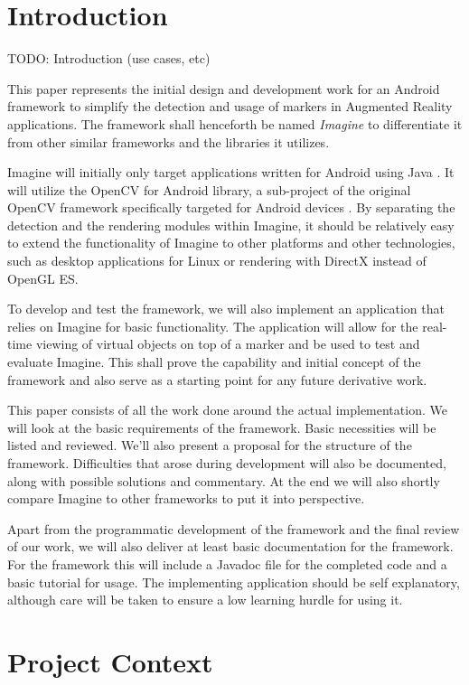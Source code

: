 \section{Introduction}

TODO: Introduction (use cases, etc)

This paper represents the initial design and development work for an Android framework to simplify the detection and usage of markers in Augmented Reality applications.
The framework shall henceforth be named \textit{Imagine} to differentiate it from other similar frameworks and the libraries it utilizes.

Imagine will initially only target applications written for Android using Java \cite{android}.
It will utilize the OpenCV for Android library, a sub-project of the original OpenCV framework specifically targeted for Android devices \cite{opencvandroid}.
By separating the detection and the rendering modules within Imagine, it should be relatively easy to extend the functionality of Imagine to other platforms and other technologies, such as desktop applications for Linux or rendering with DirectX instead of OpenGL ES.

To develop and test the framework, we will also implement an application that relies on Imagine for basic functionality.
The application will allow for the real-time viewing of virtual objects on top of a marker and be used to test and evaluate Imagine.
This shall prove the capability and initial concept of the framework and also serve as a starting point for any future derivative work.

This paper consists of all the work done around the actual implementation.
We will look at the basic requirements of the framework.
Basic necessities will be listed and reviewed.
We'll also present a proposal for the structure of the framework.
Difficulties that arose during development will also be documented, along with possible solutions and commentary.
At the end we will also shortly compare Imagine to other frameworks to put it into perspective.

Apart from the programmatic development of the framework and the final review of our work, we will also deliver at least basic documentation for the framework.
For the framework this will include a Javadoc \cite{docjava} file for the completed code and a basic tutorial for usage.
The implementing application should be self explanatory, although care will be taken to ensure a low learning hurdle for using it.

\section{Project Context}

